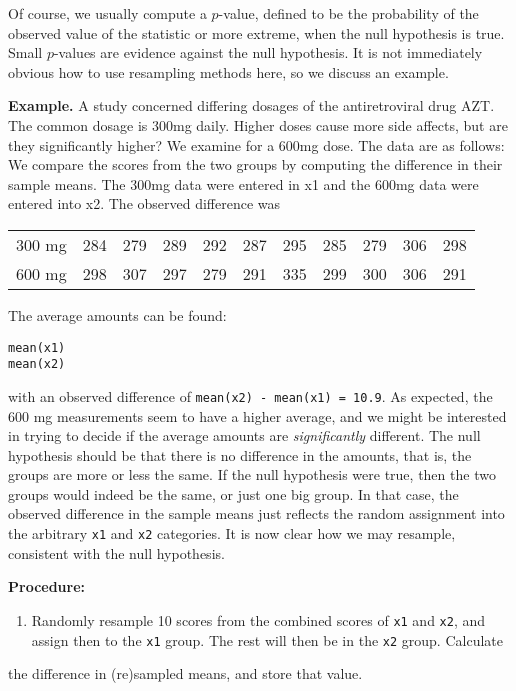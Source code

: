 \documentclass[captions=tableheading]{scrbook}
\begin{document}
\vspace{1in}


Of course, we usually compute a $p$-value, defined to be the probability of the observed value of the statistic or more extreme, when the null hypothesis is true. Small $p$-values are evidence against the null hypothesis. It is not immediately obvious how to use resampling methods here, so we discuss an example.

\textbf{Example.} A study concerned differing dosages of the antiretroviral drug AZT. The common dosage is 300mg daily. Higher doses cause more side affects, but are they significantly higher? We examine for a 600mg dose. The data are as follows: We compare the scores from the two groups by computing the difference in their sample means. The 300mg data were entered in x1 and the 600mg data were entered into x2. The observed difference was

\begin{center}
\begin{tabular}{l|cccccccccc}
300 mg  & 284  & 279  & 289  & 292  & 287  & 295  & 285  & 279  & 306  & 298 \tabularnewline
600 mg  & 298  & 307  & 297  & 279  & 291  & 335  & 299  & 300  & 306  & 291 \tabularnewline
\end{tabular}
\par\end{center}

The average amounts can be found:

\begin{verbatim}
mean(x1)
mean(x2)
\end{verbatim}


with an observed difference of \texttt{mean(x2) - mean(x1) = 10.9}. As expected, the 600 mg measurements seem to have a higher average, and we might be interested in trying to decide if the average amounts are \emph{significantly} different. The null hypothesis should be that there is no difference in the amounts, that is, the groups are more or less the same. If the null hypothesis were true, then the two groups would indeed be the same, or just one big group. In that case, the observed difference in the sample means just reflects the random assignment into the arbitrary \texttt{x1} and \texttt{x2} categories.
It is now clear how we may resample, consistent with the null hypothesis.

\textbf{Procedure:}


\begin{enumerate}
\item Randomly resample 10 scores from the combined scores of \texttt{x1} and \texttt{x2}, and assign then to the \texttt{x1} group.  The rest will then be in the \texttt{x2} group. Calculate
\end{enumerate}
the difference in (re)sampled means, and store that value.  
\end{document}
